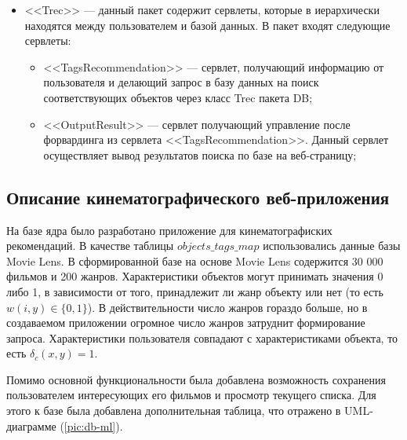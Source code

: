 \begin{itemize}
\begin{itemize}
		  \end{itemize}
	  \item <<Trec>> --- данный пакет содержит сервлеты, которые в
		  иерархически
		  находятся между пользователем и базой данных.
		  В пакет входят следующие сервлеты:
		  \begin{itemize}
			  \item <<TagsRecommendation>> --- сервлет, получающий информацию от пользователя и делающий запрос в базу данных
				  на поиск соответствующих объектов через класс Trec пакета DB;
			  \item <<OutputResult>> --- сервлет получающий управление после форвардинга из сервлета <<TagsRecommendation>>. Данный сервлет осуществляет
				  вывод результатов поиска по базе на веб-страницу;
		  \end{itemize}
\end{itemize}

\subsection{Описание кинематографического веб-приложения}
На базе ядра было разработано приложение для кинематографиских рекомендаций.
В качестве таблицы $objects\_tags\_map$ использовались данные базы Movie Lens.
В сформированной базе на основе Movie Lens содержится 30 000 фильмов и 200 жанров.
Характеристики объектов могут принимать значения 0 либо 1, в зависимости от того,
принадлежит ли жанр объекту или нет (то есть $w(i, y) \in \{0,1\}$).
В действительности число жанров гораздо больше, но в создаваемом приложении огромное число 
жанров затруднит формирование запроса. Характеристики пользователя совпадают с
характеристиками объекта, то есть $\delta_c(x, y) = 1$.

Помимо основной функциональности была добавлена возможность сохранения пользователем
интересующих его фильмов и просмотр текущего списка. Для этого к базе была
добавлена
дополнительная таблица, что отражено в UML-диаграмме (\ref{pic:db-ml}).

